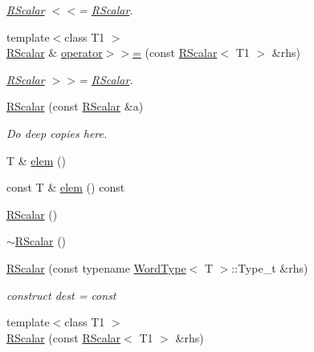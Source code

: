 \begin{DoxyCompactItemize}
\begin{DoxyCompactList}\small\item\em \mbox{\hyperlink{classENSEM_1_1RScalar}{R\+Scalar}} $<$$<$= \mbox{\hyperlink{classENSEM_1_1RScalar}{R\+Scalar}}. \end{DoxyCompactList}\item 
{\footnotesize template$<$class T1 $>$ }\\\mbox{\hyperlink{classENSEM_1_1RScalar}{R\+Scalar}} \& \mbox{\hyperlink{classENSEM_1_1RScalar_a35379cd7317c2c533aa26e3c15a9b03f}{operator$>$$>$=}} (const \mbox{\hyperlink{classENSEM_1_1RScalar}{R\+Scalar}}$<$ T1 $>$ \&rhs)
\begin{DoxyCompactList}\small\item\em \mbox{\hyperlink{classENSEM_1_1RScalar}{R\+Scalar}} $>$$>$= \mbox{\hyperlink{classENSEM_1_1RScalar}{R\+Scalar}}. \end{DoxyCompactList}\item 
\mbox{\hyperlink{classENSEM_1_1RScalar_a6aff5b3d3e105c89b56329e817eca759}{R\+Scalar}} (const \mbox{\hyperlink{classENSEM_1_1RScalar}{R\+Scalar}} \&a)
\begin{DoxyCompactList}\small\item\em Do deep copies here. \end{DoxyCompactList}\item 
T \& \mbox{\hyperlink{classENSEM_1_1RScalar_ac1e3c3dba2379fdcea237f7c2bbb1e0e}{elem}} ()
\item 
const T \& \mbox{\hyperlink{classENSEM_1_1RScalar_a26bfcd896407f15877920b5f737119fe}{elem}} () const
\item 
\mbox{\hyperlink{classENSEM_1_1RScalar_aef2d18c787b469c86b94f18e711cd556}{R\+Scalar}} ()
\item 
\mbox{\hyperlink{classENSEM_1_1RScalar_a6508c0b6ff5db38e53a19f0d376dde49}{$\sim$\+R\+Scalar}} ()
\item 
\mbox{\hyperlink{classENSEM_1_1RScalar_a49babd15684b91b796da264d2aa2681f}{R\+Scalar}} (const typename \mbox{\hyperlink{structENSEM_1_1WordType}{Word\+Type}}$<$ T $>$\+::Type\+\_\+t \&rhs)
\begin{DoxyCompactList}\small\item\em construct dest = const \end{DoxyCompactList}\item 
{\footnotesize template$<$class T1 $>$ }\\\mbox{\hyperlink{classENSEM_1_1RScalar_a93e56021a00d35af008ae72de2eb60f2}{R\+Scalar}} (const \mbox{\hyperlink{classENSEM_1_1RScalar}{R\+Scalar}}$<$ T1 $>$ \&rhs)

\end{DoxyCompactItemize}
